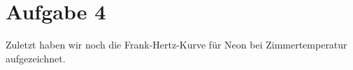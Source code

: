 \section{Aufgabe 4}

Zuletzt haben wir noch die Frank-Hertz-Kurve für Neon bei Zimmertemperatur aufgezeichnet. 